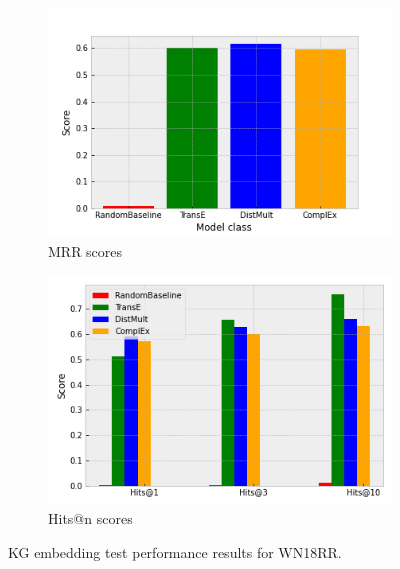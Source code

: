 \begin{figure}[htbp]
\centering
\begin{subfigure}{.5\textwidth}
  \centering
  \includegraphics[width=1\linewidth]{figures/model_selection/wn18rr_mrr.png}
  \caption{MRR scores}
  \label{fig:model_selection_mrr_wn18rr}
\end{subfigure}%
\begin{subfigure}{.5\textwidth}
  \centering
  \includegraphics[width=1\linewidth]{figures/model_selection/wn18rr_hit_scores.png}
  \caption{Hits@n scores}
  \label{fig:model_selection_hit_scores_wn18rr}
\end{subfigure}
\caption[KG embedding test  results for WN18RR KG.]{KG embedding test performance results for WN18RR.}
\label{fig:model_selection_metrics_wn18rr}
\end{figure}



